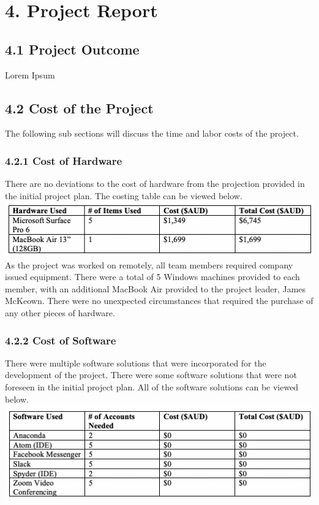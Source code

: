 \documentclass[11pt]{article}
\begin{document}

\section{4. Project Report}
\subsection{4.1 Project Outcome}
Lorem Ipsum

\subsection{4.2 Cost of the Project}
The following sub sections will discuss the time and labor costs of the project.

\subsubsection{4.2.1 Cost of Hardware}
There are no deviations to the cost of hardware from the projection provided in the initial project plan. The costing table can be viewed below. \\

\includegraphics[scale=0.71]{hardware_table.png} \\


As the project was worked on remotely, all team members required company issued equipment. There were a total of 5 Windows machines provided to each member, with an additional MacBook Air provided to the project leader, James McKeown. There were no unexpected circumstances that required the purchase of any other pieces of hardware.

\subsubsection{4.2.2 Cost of Software}
There were multiple software solutions that were incorporated for the development of the project. There were some software solutions that were not foreseen in the initial project plan. All of the software solutions can be viewed below. \\

\includegraphics[scale=0.71]{software_table.png} \\
\end{document}
